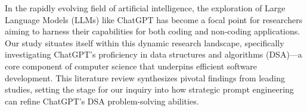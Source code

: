 



In the rapidly evolving field of artificial intelligence, the exploration of Large Language Models (LLMs) like ChatGPT has become a focal point for researchers aiming to harness their capabilities for both coding and non-coding applications. Our study situates itself within this dynamic research landscape, specifically investigating ChatGPT's proficiency in data structures and algorithms (DSA)—a core component of computer science that underpins efficient software development. This literature review synthesizes pivotal findings from leading studies, setting the stage for our inquiry into how strategic prompt engineering can refine ChatGPT's DSA problem-solving abilities.
